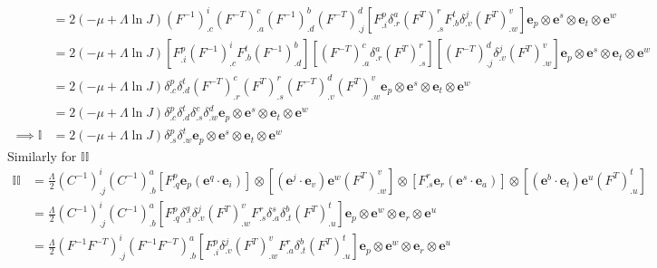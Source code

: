 \documentclass[../main.tex]{subfiles}
\begin{document}
\begin{appendices}
\begin{equation}
\begin{split}
        & = 2\left(-\mu + \Lambda\ln{J}\right) \left(F^{-1}\right)^i_{.c} \left(F^{-T}\right)^c_{.a} \left(F^{-1}\right)^b_{.d} \left(F^{-T}\right)^d_{.j} \left[F^p_{.i} \delta^a_{.r} (F^T)^r_{.s} F^t_{.b} \delta^j_{.v} (F^T)^v_{.w}\right] \boldsymbol{e}_p \otimes \boldsymbol{e}^s \otimes \boldsymbol{e}_t \otimes \boldsymbol{e}^w\\
        & = 2\left(-\mu + \Lambda\ln{J}\right)\left[ F^p_{.i} (F^{-1})^i_{.c} F^t_{.b} (F^{-1})^b_{.d}\right] \left[(F^{-T})^c_{.a} \delta^a_{.r} (F^T)^r_{.s}\right] \left[(F^{-T})^d_{.j} \delta^j_{.v} (F^T)^v_{.w}\right] \boldsymbol{e}_p \otimes \boldsymbol{e}^s \otimes \boldsymbol{e}_t \otimes \boldsymbol{e}^w\\
        & =  2\left(-\mu + \Lambda\ln{J}\right) \delta^p_{.c} \delta^t_{.d} (F^{-T})^c_{.r} (F^T)^r_{.s} (F^{-T})^d_{.v} (F^T)^v_{.w} \boldsymbol{e}_p \otimes \boldsymbol{e}^s \otimes \boldsymbol{e}_t \otimes \boldsymbol{e}^w\\
        &= 2\left(-\mu + \Lambda\ln{J}\right) \delta^p_{.c} \delta^t_{.d} \delta^c_{.s} \delta^d_{.w} \boldsymbol{e}_p \otimes \boldsymbol{e}^s \otimes \boldsymbol{e}_t \otimes \boldsymbol{e}^w\\
    \implies \mathbb{I} &= 2\left(-\mu + \Lambda\ln{J}\right) \delta^p_{.s} \delta^t_{.w} \boldsymbol{e}_p \otimes \boldsymbol{e}^s \otimes \boldsymbol{e}_t \otimes \boldsymbol{e}^w
    \end{split}
\end{equation}
Similarly for $\mathbb{II}$
\begin{equation} \label{eq:II}
    \begin{split}
        \mathbb{II} &= \frac{\Lambda}{2}\left(C^{-1}\right)^i_{.j} \left(C^{-1}\right)^a_{.b} \left[F^p_{.q} \boldsymbol{e}_p (\boldsymbol{e}^q \cdot \boldsymbol{e}_i)\right] \otimes \left[(\boldsymbol{e}^j \cdot \boldsymbol{e}_v) \boldsymbol{e}^w \left(F^T\right)^v_{.w}\right] \otimes
    \left[F^r_{.s} \boldsymbol{e}_r (\boldsymbol{e}^s \cdot \boldsymbol{e}_a)\right] \otimes \left[(\boldsymbol{e}^b \cdot \boldsymbol{e}_t) \boldsymbol{e}^u \left(F^T\right)^t_{.u} \right]\\
    &= \frac{\Lambda}{2} \left(C^{-1}\right)^i_{.j} \left(C^{-1}\right)^a_{.b} \left[F^p_{.q} \delta^q_{.i} \delta^j_{.v} (F^T)^v_{.w} F^r_{.s} \delta^s_{.a} \delta^b_{.t} (F^T)^t_{.u} \right] \boldsymbol{e}_p \otimes \boldsymbol{e}^w \otimes \boldsymbol{e}_r \otimes \boldsymbol{e}^u\\
    &= \frac{\Lambda}{2} \left(F^{-1}F^{-T}\right)^i_{.j} \left(F^{-1}F^{-T}\right)^a_{.b} \left[F^p_{.i} \delta^j_{.v} (F^T)^v_{.w} F^r_{.a} \delta^b_{.t} (F^T)^t_{.u} \right]\boldsymbol{e}_p \otimes \boldsymbol{e}^w \otimes \boldsymbol{e}_r \otimes \boldsymbol{e}^u\\

\end{split}
\end{equation}
\end{appendices}
\end{document}
